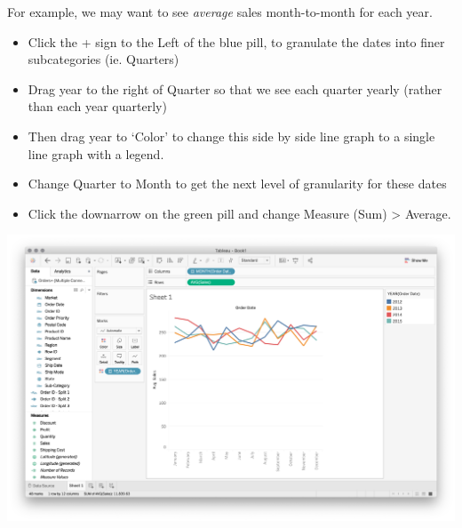 \documentclass[xcolor=svgnames]{beamer} %
\begin{document}
\begin{frame}
For example, we may want to see \textit{average} sales month-to-month for each year. 
\begin{itemize}
\item Click the + sign to the Left of the blue pill, to granulate the dates into finer subcategories (ie. Quarters)\vfill 
\item Drag year to the right of Quarter so that we see each quarter yearly (rather than each year quarterly)\vfill
\item Then drag year to `Color' to change this side by side line graph to a single line graph with a legend.\vfill
\item Change Quarter to Month to get the next level of granularity for these dates \vfill
\item  Click the downarrow on the green pill and change Measure (Sum) > Average.
\end{itemize}


\end{frame}

\begin{frame}
\begin{center}
\includegraphics[width=1.05\textwidth]{img/sales2}
\end{center}

\end{frame}
\end{document}
